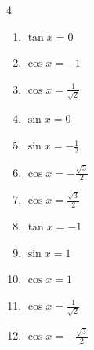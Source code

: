 \begin{multicols}{4}
\begin{enumerate}
  \item $\displaystyle \tan{x}  = 0$


  \item $\displaystyle \cos{x}  = -1$


  \item $\displaystyle \cos{x}  = \frac{1}{\sqrt{2}}$


  \item $\displaystyle \sin{x}  = 0$


  \item $\displaystyle \sin{x}  = -\frac{1}{2}$


  \item $\displaystyle \cos{x}  = -\frac{\sqrt{3}}{2}$


  \item $\displaystyle \cos{x}  = \frac{\sqrt{3}}{2}$


  \item $\displaystyle \tan{x}  = -1$


  \item $\displaystyle \sin{x}  = 1$


  \item $\displaystyle \cos{x}  = 1$


  \item $\displaystyle \cos{x}  = \frac{1}{\sqrt{2}}$


  \item $\displaystyle \cos{x}  = -\frac{\sqrt{3}}{2}$


\end{enumerate}
\end{multicols}
